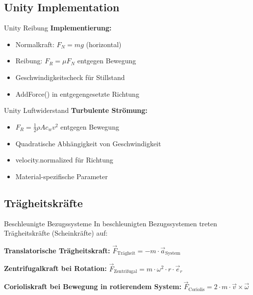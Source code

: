 \multend

\subsection{Unity Implementation}


\begin{concept}{Unity Reibung}
    \textbf{Implementierung:}
    \begin{itemize}
        \item Normalkraft: $F_N = mg$ (horizontal)
        \item Reibung: $F_R = \mu F_N$ entgegen Bewegung
        \item Geschwindigkeitscheck für Stillstand
        \item AddForce() in entgegengesetzte Richtung
    \end{itemize}
\end{concept}

\begin{concept}{Unity Luftwiderstand}
    \textbf{Turbulente Strömung:}
    \begin{itemize}
        \item $F_R = \frac{1}{2}\rho A c_w v^2$ entgegen Bewegung
        \item Quadratische Abhängigkeit von Geschwindigkeit
        \item velocity.normalized für Richtung
        \item Material-spezifische Parameter
    \end{itemize}
\end{concept}

\multend

\subsection{Trägheitskräfte}

\begin{concept}{Beschleunigte Bezugssysteme}
    In beschleunigten Bezugssystemen treten Trägheitskräfte (Scheinkräfte) auf:
    
    \textbf{Translatorische Trägheitskraft:}
    $
        \vec{F}_{\text{Trägheit}} = -m \cdot \vec{a}_{\text{System}}
    $

    \textbf{Zentrifugalkraft bei Rotation:}
    $
        \vec{F}_{\text{Zentrifugal}} = m \cdot \omega^2 \cdot r \cdot \vec{e}_r
    $
    
    \textbf{Corioliskraft bei Bewegung in rotierendem System:}
    $
        \vec{F}_{\text{Coriolis}} = 2 \cdot m \cdot \vec{v} \times \vec{\omega}
    $
\end{concept}

